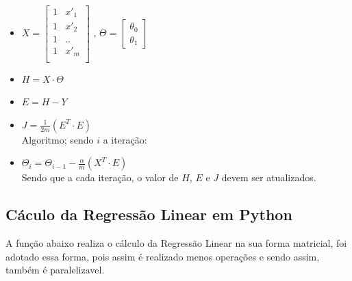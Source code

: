 \documentclass[a4paper, 12pt]{article}
\begin{document}
\begin{itemize}
    \item $X=\begin{bmatrix}
        1 & x'_1 \\
        1 & x'_2 \\
        1 & .. \\
        1 & x'_m \\
    \end{bmatrix}$ ,
    $\Theta=\begin{bmatrix}
        \theta_0\\
        \theta_1
    \end{bmatrix}$
    \item $H=X \cdot \Theta$
    \item $E=H - Y $
    \item $J=\frac{1}{2m}(E^T \cdot E)$ \\
    
    Algoritmo; sendo $i$ a iteração:
    \item $\Theta_i=\Theta_{i-1} - \frac{\alpha}{m}(X^T \cdot E)$\\
    
    Sendo que a cada iteração, o valor de $H$, $E$ e $J$ devem ser atualizados.
    
\end{itemize}
\clearpage

\subsection{Cáculo da Regressão Linear em Python}
A função abaixo realiza o cálculo da Regressão Linear na sua forma matricial, foi adotado essa forma, pois
assim é realizado menos operações e sendo assim, também é paralelizavel.
\end{document}
